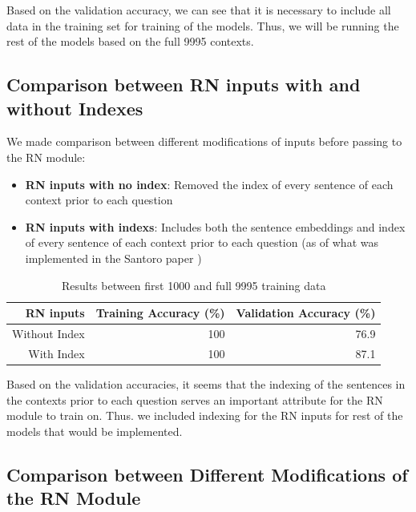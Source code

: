 \documentclass{article}
\begin{document}
 

Based on the validation accuracy, we can see that it is necessary to include all data in the training set for training of the models. Thus, we will be running the rest of the models based on the full 9995 contexts.



\subsection{Comparison between RN inputs with and without Indexes}

We made comparison between different modifications of inputs before passing to the RN module:

\begin{itemize}
\item \textbf{RN inputs with no index}: Removed the index of every sentence of each context prior to each question
\item \textbf{RN inputs with indexs}: Includes both the sentence embeddings and index of every sentence of each context prior to each question (as of what was implemented in the Santoro paper \cite{Santoro2017})
\end{itemize}

\begin{table}[H]

\begin{center}
\begin{tabular}{|r|r|r|}
		
\hline
\textbf{RN inputs}&\textbf{Training Accuracy (\%)}&\textbf{Validation Accuracy (\%)}\\
\hline
Without Index & 100 & 76.9\\
\hline
With Index & 100 & 87.1\\
\hline
		
\end{tabular}
\label{tab:wwoindex}
\end{center}

\caption{Results between first 1000 and full 9995 training data}
\end{table} 

Based on the validation accuracies, it seems that the indexing of the sentences in the contexts prior to each question serves an important attribute for the RN module to train on. Thus. we included indexing for the RN inputs for rest of the models that would be implemented. 




\subsection{Comparison between Different Modifications of the RN Module}
\end{document}
